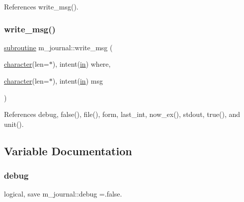 References write\+\_\+msg().

\mbox{\label{namespacem__journal_a98698c251ec1883612ae40c5f2443fd9}} 
\subsubsection{\texorpdfstring{write\+\_\+msg()}{write\_msg()}}
{\footnotesize\ttfamily \hyperlink{M__stopwatch_83_8txt_acfbcff50169d691ff02d4a123ed70482}{subroutine} m\+\_\+journal\+::write\+\_\+msg (\begin{DoxyParamCaption}\item[{\hyperlink{option__stopwatch_83_8txt_abd4b21fbbd175834027b5224bfe97e66}{character}(len=$\ast$), intent(\hyperlink{M__journal_83_8txt_afce72651d1eed785a2132bee863b2f38}{in})}]{where,  }\item[{\hyperlink{option__stopwatch_83_8txt_abd4b21fbbd175834027b5224bfe97e66}{character}(len=$\ast$), intent(\hyperlink{M__journal_83_8txt_afce72651d1eed785a2132bee863b2f38}{in})}]{msg }\end{DoxyParamCaption})\hspace{0.3cm}{\ttfamily [private]}}



References debug, false(), file(), form, last\+\_\+int, now\+\_\+ex(), stdout, true(), and unit().



\subsection{Variable Documentation}
\mbox{\label{namespacem__journal_a6184fbcebdfa06f0a45ce4c699189b53}} 
\subsubsection{\texorpdfstring{debug}{debug}}
{\footnotesize\ttfamily logical, save m\+\_\+journal\+::debug =.false.\hspace{0.3cm}{\ttfamily [private]}}

\mbox{\label{namespacem__journal_a4e2131bb2d66050e0a9a37632579c9fc}} 
